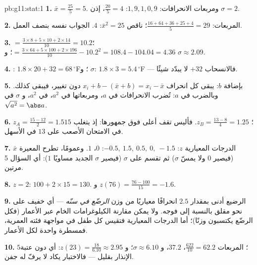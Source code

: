 \begin{solution}{pb:g11:stat:1}
\textbf{1.}  $\bar x = \frac{25}{5} = 5$. ومربعات
الانحرافات: $1, 9, 1, 0, 9$:  $\frac{20}{5} = 4$، إذن
$\sigma = 2$.

\textbf{2.}  المربعات:
$\frac{16 + 64 + 36 + 25 + 4}{5} = 29$؛ ناقص
$\bar x^2 = 25$:  $4$. الجواب نفسه بنصف العمل.

\textbf{3.}  $= \frac{3 \times 8 + 5 \times 10 + 2 \times
14}{10} = 10.2$؛  $= \frac{3 \times 64 + 5 \times 100 +
2 \times 196}{10} - 10.2^2 = 108.4 - 104.04 = 4.36$؛
و $\sigma \approx 2.09$.

\textbf{4.} : $1.8 \times 20 + 32 = 68\,^\circ$F؛
و $\sigma$: $1.8 \times 3 = 5.4\,^\circ$F --- فالانسحاب $+32$
لا يبدّد شيئًا.

\textbf{5.} بإضافة $b$: يبقى كل انحراف $x_i + b - (\bar x + b)
= x_i - \bar x$ دون تغيير، فيبقى  كذلك. وبالضرب
في $a$: تُضرب الانحرافات في $a$، ومربعاتها في
$a^2$،  في $a^2$، و $\sigma$ في
$\sqrt{a^2} = \abs a$.

\textbf{6.} $z_A = \frac{15 - 12}{2} = 1.5$؛
$z_B = \frac{13 - 8}{4} = 1.25$. فأليس تقف أعلى فوق
جمهورها: إذ يتغلب $15$ في الامتحان الأصعب على $13$ في الأسهل.

\textbf{7.} الدرجات المعيارية $z$: $-0.5,\ 1.5,\ 0.5,\ 0,\ -1.5$: 
$0$،  $1$. وعمومًا، تطرح المعيرة
$\bar x$ (فيصير  $0$ ولا يمسّ $\sigma$)
ثم تقسم على $\sigma$ (فيصير $\sigma$ الجديد مساويًا
$1$): أي السؤال 5 مرتين.

\textbf{8.} $z = 2$: $100 + 2 \times 15 = 130$. و
$z(76) = \frac{76 - 100}{15} = -1.6$.

\textbf{9.} الرضيع أدنى بمقدار $2.5$ انحرافًا معياريًا من
 وزن \emph{الرضّع في سنّه} --- أي خفيف على نحو مقلق
بالنسبة إلى فوجه. ولا يمكن مقارنة الكيلوغرامات الخام عبر الأعمار (فكل
الرضّع يكتسبون وزنًا)؛ أما الدرجات المعيارية فتقيس كل طفل في مواجهة
فئته العمرية، فمسطرة واحدة لكل الأعمار.

\textbf{10.}  $5$؛  المربعات $\frac{622}{10} = 62.2$،
 $37.2$، و $\sigma \approx 6.10$؛
و $z(23) = \frac{18}{6.10} \approx 2.95$: أي دون عتبة الإنذار
بقليل --- فالاختبار يكاد لا يرفّ له جفن.


\end{solution}
